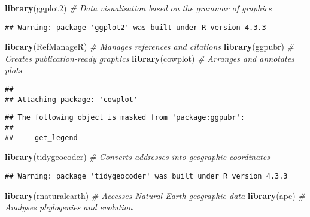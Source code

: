 \documentclass[
]{article}
\newenvironment{Shaded}{\begin{snugshade}}{\end{snugshade}}
\newcommand{\CommentTok}[1]{\textcolor[rgb]{0.56,0.35,0.01}{\textit{#1}}}
\newcommand{\FunctionTok}[1]{\textcolor[rgb]{0.13,0.29,0.53}{\textbf{#1}}}
\newcommand{\NormalTok}[1]{#1}
\begin{document}
\begin{Shaded}
\begin{Highlighting}[]
\FunctionTok{library}\NormalTok{(ggplot2)          }\CommentTok{\# Data visualisation based on the grammar of graphics}
\end{Highlighting}
\end{Shaded}

\begin{verbatim}
## Warning: package 'ggplot2' was built under R version 4.3.3
\end{verbatim}

\begin{Shaded}
\begin{Highlighting}[]
\FunctionTok{library}\NormalTok{(RefManageR)       }\CommentTok{\# Manages references and citations}
\FunctionTok{library}\NormalTok{(ggpubr)           }\CommentTok{\# Creates publication{-}ready graphics}
\FunctionTok{library}\NormalTok{(cowplot)          }\CommentTok{\# Arranges and annotates plots}
\end{Highlighting}
\end{Shaded}

\begin{verbatim}
## 
## Attaching package: 'cowplot'
\end{verbatim}

\begin{verbatim}
## The following object is masked from 'package:ggpubr':
## 
##     get_legend
\end{verbatim}

\begin{Shaded}
\begin{Highlighting}[]
\FunctionTok{library}\NormalTok{(tidygeocoder)     }\CommentTok{\# Converts addresses into geographic coordinates}
\end{Highlighting}
\end{Shaded}

\begin{verbatim}
## Warning: package 'tidygeocoder' was built under R version 4.3.3
\end{verbatim}

\begin{Shaded}
\begin{Highlighting}[]
\FunctionTok{library}\NormalTok{(rnaturalearth)    }\CommentTok{\# Accesses Natural Earth geographic data}
\FunctionTok{library}\NormalTok{(ape)              }\CommentTok{\# Analyses phylogenies and evolution}
\end{Highlighting}
\end{Shaded}
\end{document}
